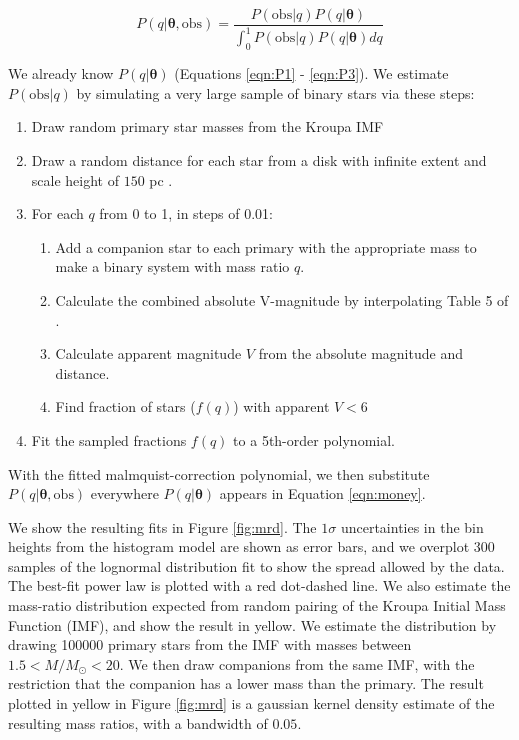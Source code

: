 \documentclass{emulateapj}
\renewcommand{\vec}[1]{\bm{#1}}
\begin{document}
\begin{equation}
P(q|\vec{\theta}, \mathrm{obs}) = \frac{P(\mathrm{obs}|q) P(q|\vec{\theta})}{\int_0^1 P(\mathrm{obs}|q) P(q|\vec{\theta}) dq}
\end{equation}

We already know $P(q|\vec{\theta})$ (Equations \ref{eqn:P1} - \ref{eqn:P3}). We estimate $P(\mathrm{obs}|q)$ by simulating a very large sample of binary stars via these steps:

\begin{enumerate}
\item Draw random primary star masses from the Kroupa IMF \citep{Kroupa2002}
\item Draw a random distance for each star from a disk with infinite extent and scale height of $150$ pc \citep[the approximate scale height of the Milky Way disk for A-type stars,][]{BM1998}. 
\item For each $q$ from 0 to 1, in steps of 0.01:
\begin{enumerate}
  \item Add a companion star to each primary with the appropriate mass to make a binary system with mass ratio $q$.
  \item Calculate the combined absolute V-magnitude by interpolating Table 5 of \citet{Pecaut2013}.
  \item Calculate apparent magnitude $V$ from the absolute magnitude and distance.
  \item Find fraction of stars ($f(q)$) with apparent $V < 6$
\end{enumerate}
\item Fit the sampled fractions $f(q)$ to a 5th-order polynomial.
\end{enumerate}

With the fitted malmquist-correction polynomial, we then substitute $P(q|\vec{\theta}, \mathrm{obs})$ everywhere $P(q|\vec{\theta})$ appears in Equation \ref{eqn:money}.

We show the resulting fits in Figure \ref{fig:mrd}. The $1\sigma$ uncertainties in the bin heights from the histogram model are shown as error bars, and we overplot 300 samples of the lognormal distribution fit to show the spread allowed by the data. The best-fit power law is plotted with a red dot-dashed line. We also estimate the mass-ratio distribution expected from random pairing of the Kroupa Initial Mass Function (IMF), and show the result in yellow. We estimate the distribution by drawing 100000 primary stars from the IMF with masses between $1.5 < M/M_{\odot} < 20$. We then draw companions from the same IMF, with the restriction that the companion has a lower mass than the primary. The result plotted in yellow in Figure \ref{fig:mrd} is a gaussian kernel density estimate of the resulting mass ratios, with a bandwidth of $0.05$.
\end{document}
